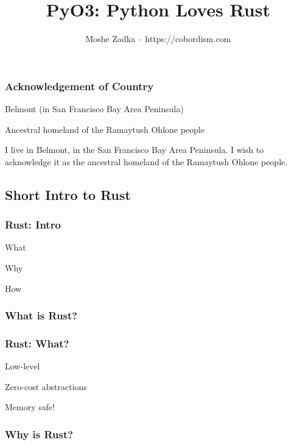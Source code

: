 \documentclass{article}
\title{PyO3: Python Loves Rust}
\author{Moshe Zadka -- https://cobordism.com}
\date{}
\begin{document}
\begin{titlepage}
\maketitle
\end{titlepage}

\frame{\titlepage}

\begin{frame}
\frametitle{Acknowledgement of Country}

Belmont (in San Francisco Bay Area Peninsula)

Ancestral homeland of the Ramaytush Ohlone people

\end{frame}

I live in Belmont, in the San Francisco Bay Area Peninsula. I wish to
acknowledge it as the ancestral homeland of the Ramaytush Ohlone people.

\hypertarget{short-intro-to-rust}{%
\subsection{Short Intro to Rust}\label{short-intro-to-rust}}

\begin{frame}
\frametitle{Rust: Intro}

\pause

What \pause

Why \pause

How

\end{frame}

\hypertarget{what-is-rust}{%
\subsubsection{What is Rust?}\label{what-is-rust}}

\begin{frame}
\frametitle{Rust: What?}

\pause

Low-level \pause

Zero-cost abstractions \pause

Memory safe!

\end{frame}

\hypertarget{why-is-rust}{%
\subsubsection{Why is Rust?}\label{why-is-rust}}
\end{document}
